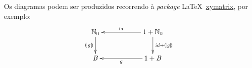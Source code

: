 \documentclass[a4paper]{article}
\newcommand{\Varid}[1]{\mathit{#1}}
\begin{document}
Os diagramas podem ser produzidos recorrendo à \emph{package} \LaTeX\ 
\href{https://ctan.org/pkg/xymatrix}{xymatrix}, por exemplo: 
\begin{eqnarray*}
\xymatrix@C=2cm{
    \ensuremath{\N_0}
           \ar[d]_-{\ensuremath{\cata{\Varid{g}}}}
&
    \ensuremath{\mathrm{1}\mathbin{+}\N_0}
           \ar[d]^{\ensuremath{\Varid{id}\mathbin{+}\cata{\Varid{g}}}}
           \ar[l]_-{\ensuremath{\mathsf{in}}}
\\
     \ensuremath{\mathit B}
&
     \ensuremath{\mathrm{1}\mathbin{+}\mathit B}
           \ar[l]^-{\ensuremath{\Varid{g}}}
}
\end{eqnarray*}



\printindex



\end{document}
